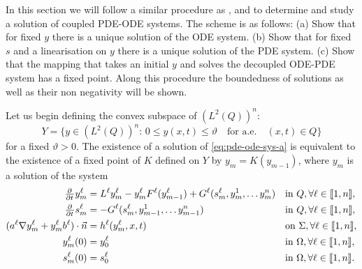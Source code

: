 \documentclass[11pt]{article}
\newcommand{\llb}{\llbracket}
\newcommand{\rrb}{\rrbracket}
\numberwithin{equation}{section}
\begin{document}
In this section we will follow a similar procedure as \cite{Eisenhofer-2013,Ptashnyk-2010,Marciniak-2010}, and \cite{Ptashnyk-2016} to
determine and study a solution of coupled PDE-ODE systems. The scheme is as follows: (a) Show that for fixed \(y\) there is a unique solution of the ODE system. (b) Show that for fixed \(s\) and a linearisation on \(y\) there is a unique solution of the PDE system. (c) Show that the mapping that takes an initial \(y\) and solves the decoupled ODE-PDE system has a fixed point. 
Along this procedure the boundedness of solutions as well as their non negativity will be shown.

Let us begin defining the convex subspace of \((L^2 (Q))^n\):
\[
	Y = \big\{ y \in	(L^2 (Q))^n:\, 	%
	0 \leq y(x,t) \leq \vartheta \quad\text{for a.e.}\quad (x,t) \in Q \big\}
\]
for a fixed \(\vartheta > 0\).
%
The existence of a solution of \eqref{eq:pde-ode-sys-a} is equivalent to the existence
of a fixed point of \(K\) defined on 
\(Y\) %
%
%
%
%
by \( y_m = K(y_{m-1}) \), where \(y_m\) is a solution of the system
\begin{subequations}
\label{sys:de-coupled}
\begin{align}
	\pd{ }{t} y_m^\ell &= L^\ell y_m^\ell - y^\ell_m F^\ell(y_{m-1}^\ell) + G^\ell(s_m^\ell,y_{m}^1,\ldots y_{m}^n) 		&& \text{in } Q, \forall \ell \in \llb 1,n\rrb,
	\label{sys:de-coupled-pde}
	\\
	\pd{ }{t} s_m^\ell &= -G^\ell(s_m^\ell,y_{m-1}^1,\ldots y_{m-1}^n)				&& \text{in } Q,\forall \ell \in \llb 1,n\rrb,
	\label{sys:de-coupled-ode}
	\\
	 (a^\ell  \nabla y_m^\ell + y_m^\ell b^\ell) \cdot \vec{n} &= h^\ell (y_{m}^\ell, x,t)	&& \text{on } \Sigma,\forall \ell \in \llb 1,n\rrb,
	 \label{sys:de-coupled-pde-b}
	 \\
	 y_m^\ell(0) &= y^\ell_{0}			 && \text{in } \Omega, \forall \ell \in \llb 1,n\rrb,
	 \label{sys:de-coupled-pde-i}
	 \\
	 s_m^\ell(0) &= s^\ell_{0}			 && \text{in } \Omega, \forall \ell \in \llb 1,n\rrb.
	 \label{sys:de-coupled-ode-i}
\end{align}
\end{subequations}
\end{document}
